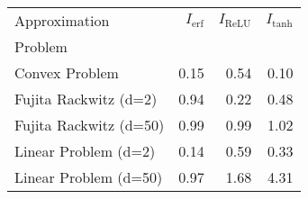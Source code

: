 \begin{tabular}{lrrr}
Approximation & $I_\text{erf}$ & $I_\text{ReLU}$ & $I_\text{tanh}$ \\
Problem &  &  &  \\
Convex Problem & 0.15 & 0.54 & 0.10 \\
Fujita Rackwitz (d=2) & 0.94 & 0.22 & 0.48 \\
Fujita Rackwitz (d=50) & 0.99 & 0.99 & 1.02 \\
Linear Problem (d=2) & 0.14 & 0.59 & 0.33 \\
Linear Problem (d=50) & 0.97 & 1.68 & 4.31 \\
\end{tabular}
